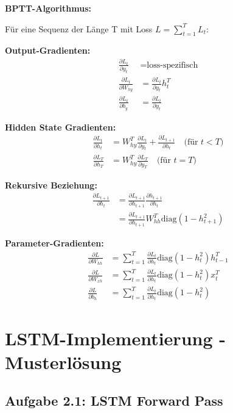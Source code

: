 ﻿\documentclass[12pt,a4paper]{article}
\begin{document}
\textbf{BPTT-Algorithmus:}

Für eine Sequenz der Länge T mit Loss $L = \sum_{t=1}^T L_t$:

\textbf{Output-Gradienten:}
\begin{align}
\frac{\partial L_t}{\partial y_t} &= \text{loss-spezifisch} \\
\frac{\partial L_t}{\partial W_{hy}} &= \frac{\partial L_t}{\partial y_t} h_t^T \\
\frac{\partial L_t}{\partial b_y} &= \frac{\partial L_t}{\partial y_t}
\end{align}

\textbf{Hidden State Gradienten:}
\begin{align}
\frac{\partial L_t}{\partial h_t} &= W_{hy}^T \frac{\partial L_t}{\partial y_t} + \frac{\partial L_{t+1}}{\partial h_t} \quad \text{(für } t < T \text{)} \\
\frac{\partial L_T}{\partial h_T} &= W_{hy}^T \frac{\partial L_T}{\partial y_T} \quad \text{(für } t = T \text{)}
\end{align}

\textbf{Rekursive Beziehung:}
\begin{align}
\frac{\partial L_{t+1}}{\partial h_t} &= \frac{\partial L_{t+1}}{\partial h_{t+1}} \frac{\partial h_{t+1}}{\partial h_t} \\
&= \frac{\partial L_{t+1}}{\partial h_{t+1}} W_{hh}^T \text{diag}(1 - h_{t+1}^2)
\end{align}

\textbf{Parameter-Gradienten:}
\begin{align}
\frac{\partial L}{\partial W_{hh}} &= \sum_{t=1}^T \frac{\partial L_t}{\partial h_t} \text{diag}(1 - h_t^2) h_{t-1}^T \\
\frac{\partial L}{\partial W_{xh}} &= \sum_{t=1}^T \frac{\partial L_t}{\partial h_t} \text{diag}(1 - h_t^2) x_t^T \\
\frac{\partial L}{\partial b_h} &= \sum_{t=1}^T \frac{\partial L_t}{\partial h_t} \text{diag}(1 - h_t^2)
\end{align}

\section{LSTM-Implementierung - Musterlösung}

\subsection{Aufgabe 2.1: LSTM Forward Pass}
\end{document}
